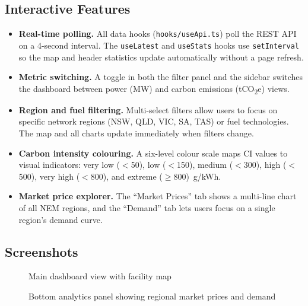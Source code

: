 \documentclass[11pt,a4paper]{article}
\begin{document}
\subsection{Interactive Features}

\begin{itemize}
    \item \textbf{Real-time polling.} All data hooks (\texttt{hooks/useApi.ts}) poll the REST API on a 4-second interval. The \texttt{useLatest} and \texttt{useStats} hooks use \texttt{setInterval} so the map and header statistics update automatically without a page refresh.
    \item \textbf{Metric switching.} A toggle in both the filter panel and the sidebar switches the dashboard between power (MW) and carbon emissions (tCO\textsubscript{2}e) views.
    \item \textbf{Region and fuel filtering.} Multi-select filters allow users to focus on specific network regions (NSW, QLD, VIC, SA, TAS) or fuel technologies. The map and all charts update immediately when filters change.
    \item \textbf{Carbon intensity colouring.} A six-level colour scale maps CI values to visual indicators: very low ($<$50), low ($<$150), medium ($<$300), high ($<$500), very high ($<$800), and extreme ($\ge$800)~g/kWh.
    \item \textbf{Market price explorer.} The ``Market Prices'' tab shows a multi-line chart of all NEM regions, and the ``Demand'' tab lets users focus on a single region's demand curve.
\end{itemize}

\subsection{Screenshots}

\begin{figure}[H]
    \centering
    \caption{Main dashboard view with facility map}
    \label{fig:dashboard}
\end{figure}

\begin{figure}[H]
    \centering
    \caption{Bottom analytics panel showing regional market prices and demand}
\end{figure}
\end{document}
